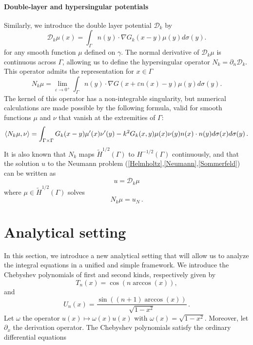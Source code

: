 \documentclass[a4paper]{article}
\begin{document}
\paragraph{Double-layer and hypersingular potentials}
Similarly, we introduce the double layer potential $\mathcal{D}_k$ by 
\[\mathcal{D}_k \mu(x) = \int_{\Gamma} n(y) \cdot \nabla G_k(x-y) \mu(y) d\sigma(y).\]
for any smooth function $\mu$ defined on $\gamma$.
The normal derivative of $\mathcal{D}_k\mu$ is continuous across $\Gamma$, allowing us to define the hypersingular operator $N_k = \partial_n \mathcal{D}_k$. This operator admits the representation for $x\in \Gamma$
\begin{equation}
	N_k \mu = \lim_{\varepsilon \to 0^+} \int_{\Gamma} n(y) \cdot \nabla G(x + \varepsilon n(x) - y) \mu(y) d\sigma(y).
	\label{defNk}
\end{equation}
The kernel of this operator has a non-integrable singularity, but numerical calculations are made possible by the following formula, valid for smooth functions $\mu$ and $\nu$ that vanish at the extremities of $\Gamma$: 
\begin{equation}
	\left\langle N_k \mu,\nu\right\rangle = \int_{\Gamma\times \Gamma} G_k(x-y) \mu'(x) \nu'(y) - k^2 G_k(x,y) \mu(x) \nu(y) n(x) \cdot n(y) d\sigma(x) d\sigma(y)\,.
	\label{NkenfonctiondeSk}
\end{equation}
It is also known that $N_k$ maps $\tilde{H}^{1/2}(\Gamma)$ to $H^{-1/2}(\Gamma)$ continuously, and that the solution $u$ to the Neumann problem (\ref{Helmholtz},\ref{Neumann},\ref{Sommerfeld}) can be written as
\begin{equation}
	u = \mathcal{D}_k \mu
\end{equation}
where $\mu \in \tilde{H}^{1/2}(\Gamma)$ solves
\begin{equation}
	N_k \mu = u_N\,.
	\label{Nkmu}
\end{equation}  
	
	
\section{Analytical setting}
\label{sec:analyticalSetting}

In this section, we introduce a new analytical setting that will allow us to analyze the integral equations in a unified and simple framework.	We introduce the Chebyshev polynomials of first and second kinds, respectively given by 
\[T_n(x) = \cos(n \arccos(x)),\]
and 
\[U_n(x) = \dfrac{\sin((n+1) \arccos(x))}{\sqrt{1 - x^2}}\,.\]
Let $\omega$ the operator $u(x) \mapsto \omega(x)u(x)$ with $\omega(x) = \sqrt{1 - x^2}$. Moreover, let $\partial_x$ the derivation operator. The Chebyshev polynomials satisfy
the ordinary differential equations
\end{document}
